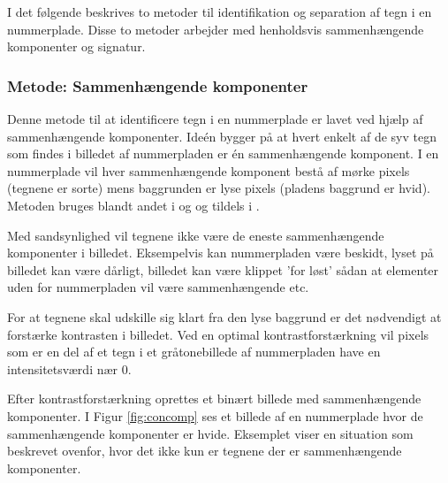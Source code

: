


I det følgende beskrives to metoder til identifikation og separation af tegn i en nummerplade. Disse to metoder arbejder med henholdsvis sammenhængende komponenter og signatur.


\subsubsection*{Metode: Sammenhængende komponenter}
Denne metode til at identificere tegn i en nummerplade er lavet ved hjælp af sammenhængende komponenter. Ideén bygger på at hvert enkelt af de syv tegn som findes i billedet af nummerpladen er én sammenhængende komponent. I en nummerplade vil hver sammenhængende komponent bestå af mørke pixels (tegnene er sorte) mens baggrunden er lyse pixels (pladens baggrund er hvid). Metoden bruges blandt andet i \cite{nijhuis} og \cite{parker} og tildels i \cite{kwas}.

Med sandsynlighed vil tegnene ikke være de eneste sammenhængende komponenter i billedet. Eksempelvis kan nummerpladen være beskidt, lyset på billedet kan være dårligt, billedet kan være klippet 'for løst' sådan at elementer uden for nummerpladen vil være sammenhængende etc.

For at tegnene skal udskille sig klart fra den lyse baggrund er det nødvendigt at forstærke kontrasten i billedet. Ved en optimal kontrastforstærkning vil pixels som er en del af et tegn i et gråtonebillede af nummerpladen have en intensitetsværdi nær 0.



Efter kontrastforstærkning oprettes et binært billede med sammenhængende komponenter. I Figur \vref{fig:concomp} ses et billede af en nummerplade hvor de sammenhængende komponenter er hvide. Eksemplet viser en situation som beskrevet ovenfor, hvor det ikke kun er tegnene der er sammenhængende komponenter.

